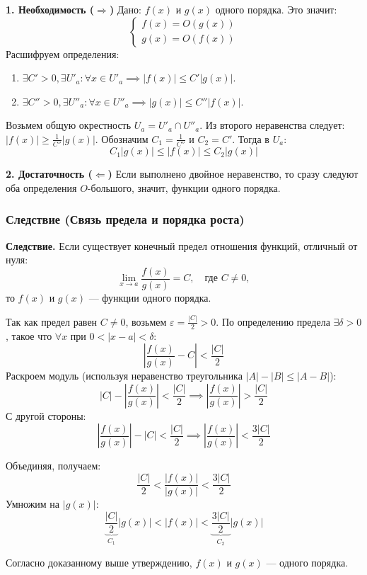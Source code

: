 \begin{tcolorbox}[title=Доказательство]
    \textbf{1. Необходимость ($\Rightarrow$)}
    Дано: $f(x)$ и $g(x)$ одного порядка. Это значит:
    \[ \begin{cases} f(x) = O(g(x)) \\ g(x) = O(f(x)) \end{cases} \]
    Расшифруем определения:
    \begin{enumerate}
        \item $\exists C' > 0, \exists U'_a: \forall x \in U'_a \implies |f(x)| \le C' |g(x)|$.
        \item $\exists C'' > 0, \exists U''_a: \forall x \in U''_a \implies |g(x)| \le C'' |f(x)|$.
    \end{enumerate}
    Возьмем общую окрестность $U_a = U'_a \cap U''_a$.
    Из второго неравенства следует: $|f(x)| \ge \frac{1}{C''} |g(x)|$.
    Обозначим $C_1 = \frac{1}{C''}$ и $C_2 = C'$. Тогда в $U_a$:
    \[ C_1 |g(x)| \le |f(x)| \le C_2 |g(x)| \]

    \textbf{2. Достаточность ($\Leftarrow$)}
    Если выполнено двойное неравенство, то сразу следуют оба определения $O$-большого, значит, функции одного порядка.
\end{tcolorbox}

\subsubsection*{Следствие (Связь предела и порядка роста)}
\textbf{Следствие.} Если существует конечный предел отношения функций, отличный от нуля:
\[ \lim_{x \to a} \frac{f(x)}{g(x)} = C, \quad \text{где } C \neq 0, \]
то $f(x)$ и $g(x)$ — функции одного порядка.

\begin{tcolorbox}[title=Доказательство]
    Так как предел равен $C \neq 0$, возьмем $\varepsilon = \frac{|C|}{2} > 0$.
    По определению предела $\exists \delta > 0$, такое что $\forall x$ при $0 < |x-a| < \delta$:
    \[ \left| \frac{f(x)}{g(x)} - C \right| < \frac{|C|}{2} \]
    Раскроем модуль (используя неравенство треугольника $|A| - |B| \le |A-B|$):
    \[ |C| - \left| \frac{f(x)}{g(x)} \right| < \frac{|C|}{2} \implies \left| \frac{f(x)}{g(x)} \right| > \frac{|C|}{2} \]
    С другой стороны:
    \[ \left| \frac{f(x)}{g(x)} \right| - |C| < \frac{|C|}{2} \implies \left| \frac{f(x)}{g(x)} \right| < \frac{3|C|}{2} \]
    
    Объединяя, получаем:
    \[ \frac{|C|}{2} < \frac{|f(x)|}{|g(x)|} < \frac{3|C|}{2} \]
    Умножим на $|g(x)|$:
    \[ \underbrace{\frac{|C|}{2}}_{C_1} |g(x)| < |f(x)| < \underbrace{\frac{3|C|}{2}}_{C_2} |g(x)| \]
    
    Согласно доказанному выше утверждению, $f(x)$ и $g(x)$ — одного порядка.
\end{tcolorbox}


